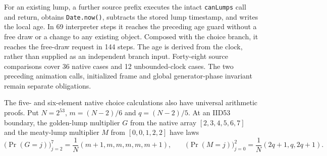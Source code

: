 \documentclass[11pt,a4paper]{article}
\numberwithin{equation}{section}
\theoremstyle{definition}
\theoremstyle{remark}
\begin{document}
For an existing lump, a further source prefix executes the intact \texttt{canLumps} call and return, obtains \texttt{Date.now()}, subtracts the stored lump timestamp, and writes the local age. In 69 interpreter steps it reaches the preceding age guard without a free draw or a change to any existing object. Composed with the choice branch, it reaches the free-draw request in 144 steps. The age is derived from the clock, rather than supplied as an independent branch input. Forty-eight source comparisons cover 36 native cases and 12 unbounded-clock cases. The two preceding animation calls, initialized frame and global generator-phase invariant remain separate obligations.

The five- and six-element native choice calculations also have universal arithmetic proofs. Put $N=2^{53}$, $m=(N-2)/6$ and $q=(N-2)/5$. At an IID53 boundary, the golden-lump multiplier $G$ from the native array $[2,3,4,5,6,7]$ and the meaty-lump multiplier $M$ from $[0,0,1,2,2]$ have laws
\[
 \bigl(\Pr(G=j)\bigr)_{j=2}^{7}
   =\frac1N(m+1,m,m,m,m,m+1),\qquad
 \bigl(\Pr(M=j)\bigr)_{j=0}^{2}
   =\frac1N(2q+1,q,2q+1).
\]
\end{document}

